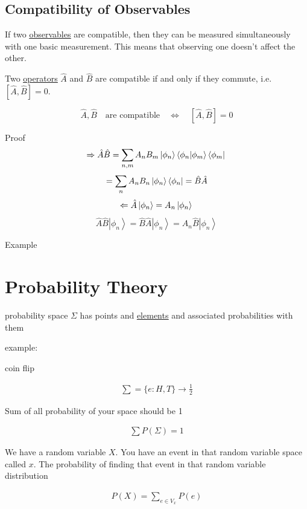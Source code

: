 \documentclass[
]{article}
\let\oldhyperref\hyperref
\renewcommand{\hyperref}[2][]{\oldhyperref[#1]{\underline{#2}}}
\providecommand{\ket}[1]{\left\lvert #1 \right\rangle}
\providecommand{\bra}[1]{\left\langle #1 \right\rvert}
\providecommand{\braket}[1]{\left\langle #1 \right\rangle}
\providecommand{\Rarr}{\Rightarrow}
\providecommand{\Larr}{\Leftarrow}
\providecommand{\rarr}{\rightarrow}
\begin{document}
\subsection{Compatibility of Observables}\label{compatibility-of-observables}
If two \hyperref[observables]{observables} are compatible, then they can be measured simultaneously with one basic measurement.
This means that observing one doesn't affect the other.

Two \hyperref[operators]{operators} \(\hat{A}\) and \(\hat{B}\) are compatible if and only if they commute, i.e. \([\hat{A},\hat{B}]=0\).

\[
	\hat{A},\hat{B}\quad\text{are compatible}\quad\Leftrightarrow\quad[\hat{A},\hat{B}]=0
\]

Proof
\[
	\Rarr \hat{A}\hat{B}=\sum_{n,m}A_nB_m\ket{\phi_n}\braket{\phi_n|\phi_m}\bra{\phi_m}\\
\]
\[
	=\sum_nA_nB_n\ket{\phi_n}\bra{\phi_n}=\hat{B}\hat{A}\\
\]
\[
	\Larr \hat{A}\ket{\phi_n}=A_n\ket{\phi_n}\\
\]
\[
	\hat{A}\hat{B}\ket{\phi_n}=\hat{B}\hat{A}\ket{\phi_n}=A_n\hat{B}\ket{\phi_n}
\]


Example




\section{Probability Theory}\label{probability-theory}

probability space \(\Sigma\) has points and \hyperref[element]{elements} and associated
probabilities with them

example:

coin flip

\begin{gather*}
	\sum=\{e:H,T\}\rarr\frac{1}{2}
\end{gather*}

Sum of all probability of your space should be 1

\begin{gather*}
	\sum P(\Sigma)=1
\end{gather*}

We have a random variable \(X\). You have an event in that random
variable space called \(x\). The probability of finding that event in
that random variable distribution

\begin{gather*}
	P(X)=\sum_{e\in V_x}P(e)
\end{gather*}
\end{document}
